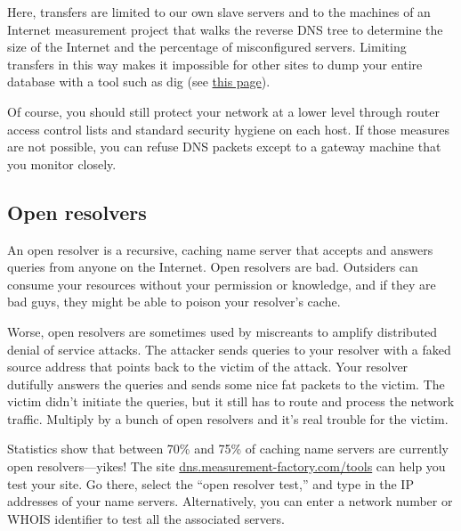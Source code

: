 
Here, transfers are limited to our own slave servers and to the machines
of an Internet measurement project that walks the reverse DNS tree to
determine the size of the Internet and the percentage of misconfigured
servers. Limiting transfers in this way makes it impossible for other
sites to dump your entire database with a tool such as {dig} (see
\protect\hyperlink{part0024_split_018.htmlux5cux23_idTextAnchor863}{this
page}).

Of course, you should still protect your network at a lower level
through router access control lists and standard security hygiene on
each host. If those measures are not possible, you can refuse DNS
packets except to a gateway machine that you monitor closely.

\protect\hypertarget{part0024_split_055.html}{}{}

\hypertarget{part0024_split_055.htmlux5cux23_idContainer1069}{}
\hypertarget{part0024_split_055.htmlux5cux23calibre_pb_54}{%
\subsection[Open
resolvers]{\texorpdfstring{\protect\hypertarget{part0024_split_055.htmlux5cux23_idTextAnchor934}{}{}Open
resolvers}{Open resolvers}}\label{part0024_split_055.htmlux5cux23calibre_pb_54}}

\protect\hypertarget{part0024_split_055.htmlux5cux23_idIndexMarker2241}{}{}\protect\hypertarget{part0024_split_055.htmlux5cux23_idIndexMarker2242}{}{}An
open resolver is a recursive, caching name server that accepts and
answers queries from anyone on the Internet. Open resolvers are bad.
Outsiders can consume your resources without your permission or
knowledge, and if they are bad guys, they might be able to poison your
resolver's cache.

Worse, open resolvers are sometimes used by miscreants to amplify
distributed
\protect\hypertarget{part0024_split_055.htmlux5cux23_idIndexMarker2243}{}{}denial
of service attacks. The attacker sends queries to your resolver with a
faked source address that points back to the victim of the attack. Your
resolver dutifully answers the queries and sends some nice fat packets
to the victim. The victim didn't initiate the queries, but it still has
to route and process the network traffic. Multiply by a bunch of open
resolvers and it's real trouble for the victim.

Statistics show that between 70\% and 75\% of caching name servers are
currently open resolvers---yikes! The site
\href{http://dns.measurement-factory.com/tools}{dns.measurement-factory.com/tools}
can help you test your site. Go there, select the ``open resolver
test,'' and type in the IP addresses of your name servers.
Alternatively, you can enter a network number or WHOIS identifier to
test all the associated servers.

